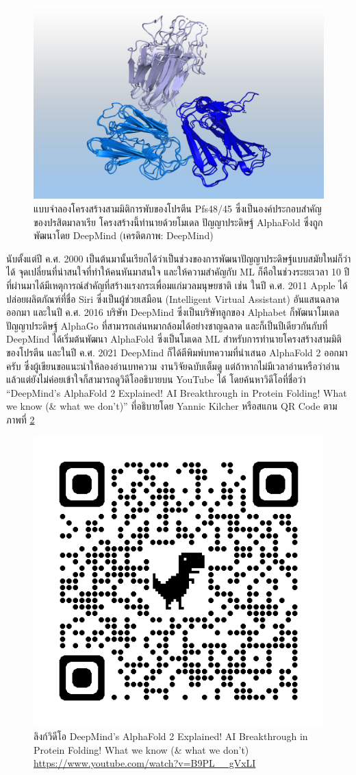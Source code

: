 \begin{figure}[htbp]
    \centering
    \includegraphics[width=\linewidth]{fig/malaria-parasite-protein-deepmind.jpeg}
    \caption{แบบจำลองโครงสร้างสามมิติการพับของโปรตีน Pfs48/45 ซึ่งเป็นองค์ประกอบสำคัญของปรสิตมาลาเรีย โครงสร้างนี้ทำนายด้วยโมเดล 
    ปัญญาประดิษฐ์ AlphaFold ซึ่งถูกพัฒนาโดย DeepMind (เครดิตภาพ: DeepMind)}
    \label{fig:malaria_parasite}
\end{figure}

นับตั้งแต่ปี ค.ศ. 2000 เป็นต้นมานั้นเรียกได้ว่าเป็นช่วงของการพัฒนาปัญญาประดิษฐ์แบบสมัยใหม่ก็ว่าได้ จุดเปลี่ยนที่น่าสนใจที่ทำให้คนหันมาสนใจ%
และให้ความสำคัญกับ ML ก็คือในช่วงระยะเวลา 10 ปีที่ผ่านมาได้มีเหตุการณ์สำคัญที่สร้างแรงกระเพื่อมแก่มวลมนุษยชาติ เช่น ในปี ค.ศ. 2011 
Apple ได้ปล่อยผลิตภัณฑ์ที่ชื่อ Siri ซึ่งเป็นผู้ช่วยเสมือน (Intelligent Virtual Assistant) อันแสนฉลาดออกมา และในปี ค.ศ. 2016 
บริษัท DeepMind ซึ่งเป็นบริษัทลูกของ Alphabet ก็พัฒนาโมเดลปัญญาประดิษฐ์ AlphaGo ที่สามารถเล่นหมากล้อมได้อย่างชาญฉลาด 
และก็เป็นปีเดียวกันกับที่ DeepMind ได้เริ่มต้นพัฒนา AlphaFold ซึ่งเป็นโมเดล ML สำหรับการทำนายโครงสร้างสามมิติของโปรตีน และในปี ค.ศ. 
2021 DeepMind ก็ได้ตีพิมพ์บทความที่นำเสนอ AlphaFold 2 ออกมาครับ\autocite{jumper2021} ซึ่งผู้เขียนขอแนะนำให้ลองอ่านบทความ%
งานวิจัยฉบับเต็มดู แต่ถ้าหากไม่มีเวลาอ่านหรือว่าอ่านแล้วแต่ยังไม่ค่อยเข้าใจก็สามารถดูวิดีโออธิบายบน YouTube ได้ โดยค้นหาวิดีโอที่ชื่อว่า 
\enquote{DeepMind's AlphaFold 2 Explained! AI Breakthrough in Protein Folding! What we know (\& what we don't)} 
ที่อธิบายโดย Yannic Kilcher หรือสแกน QR Code ตามภาพที่ \ref{fig:qr_code_alphafold}

\begin{figure}[htbp]
    \centering
    \includegraphics[width=0.3\linewidth]{fig/qr_code_alphafold2_explained.png}
    \caption{ลิงก์วิดีโอ DeepMind's AlphaFold 2 Explained! AI Breakthrough in Protein Folding! What we know 
    (\& what we don't) \url{https://www.youtube.com/watch?v=B9PL__gVxLI}}
    \label{fig:qr_code_alphafold}
\end{figure}

